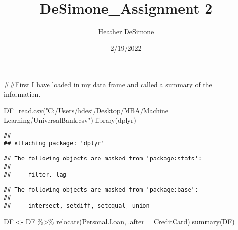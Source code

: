 \documentclass[
]{article}
\title{DeSimone\_Assignment 2}
\author{Heather DeSimone}
\date{2/19/2022}
\newenvironment{Shaded}{\begin{snugshade}}{\end{snugshade}}
\newcommand{\AttributeTok}[1]{\textcolor[rgb]{0.77,0.63,0.00}{#1}}
\newcommand{\FunctionTok}[1]{\textcolor[rgb]{0.00,0.00,0.00}{#1}}
\newcommand{\NormalTok}[1]{#1}
\newcommand{\OtherTok}[1]{\textcolor[rgb]{0.56,0.35,0.01}{#1}}
\newcommand{\SpecialCharTok}[1]{\textcolor[rgb]{0.00,0.00,0.00}{#1}}
\newcommand{\StringTok}[1]{\textcolor[rgb]{0.31,0.60,0.02}{#1}}
\begin{document}
\maketitle

\#\#First I have loaded in my data frame and called a summary of the
information.

\begin{Shaded}
\begin{Highlighting}[]
\NormalTok{DF}\OtherTok{=}\FunctionTok{read.csv}\NormalTok{(}\StringTok{"C:/Users/hdesi/Desktop/MBA/Machine Learning/UniversalBank.csv"}\NormalTok{)}
\FunctionTok{library}\NormalTok{(dplyr)}
\end{Highlighting}
\end{Shaded}

\begin{verbatim}
## 
## Attaching package: 'dplyr'
\end{verbatim}

\begin{verbatim}
## The following objects are masked from 'package:stats':
## 
##     filter, lag
\end{verbatim}

\begin{verbatim}
## The following objects are masked from 'package:base':
## 
##     intersect, setdiff, setequal, union
\end{verbatim}

\begin{Shaded}
\begin{Highlighting}[]
\NormalTok{DF }\OtherTok{\textless{}{-}}\NormalTok{ DF }\SpecialCharTok{\%\textgreater{}\%} \FunctionTok{relocate}\NormalTok{(Personal.Loan, }\AttributeTok{.after =}\NormalTok{ CreditCard)}
\FunctionTok{summary}\NormalTok{(DF)}
\end{Highlighting}
\end{Shaded}
\end{document}

